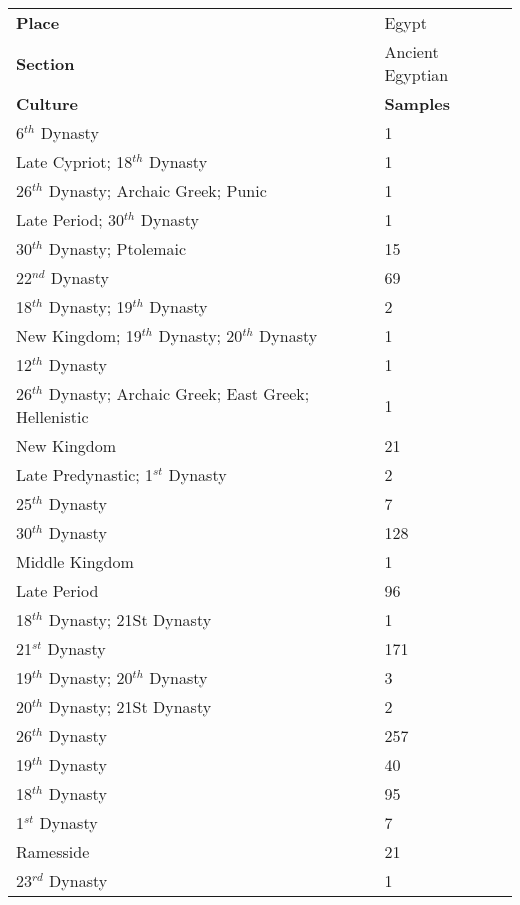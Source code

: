 \documentclass[11pt]{article}
\begin{document}
\begin{table}[ht]
    \centering
    \small
    \begin{tabularx}{\columnwidth}{Xl}
        \hline
        \rowcolor{brown!30} \textbf{Place} & Egypt \\
        \rowcolor{brown!20} \textbf{Section} & Ancient Egyptian \\
        \hline
        \rowcolor{brown!10} \textbf{Culture} & \textbf{Samples} \\
        \hline
        6$^{th}$ Dynasty & 1 \\
        Late Cypriot; 18$^{th}$ Dynasty & 1 \\
        26$^{th}$ Dynasty; Archaic Greek; Punic & 1 \\
        Late Period; 30$^{th}$ Dynasty & 1 \\
        30$^{th}$ Dynasty; Ptolemaic & 15 \\
        22$^{nd}$ Dynasty & 69 \\
        18$^{th}$ Dynasty; 19$^{th}$ Dynasty & 2 \\
        New Kingdom; 19$^{th}$ Dynasty; 20$^{th}$ Dynasty & 1 \\
        12$^{th}$ Dynasty & 1 \\
        26$^{th}$ Dynasty; Archaic Greek; East Greek; Hellenistic & 1 \\
        New Kingdom & 21 \\
        Late Predynastic; 1$^{st}$ Dynasty & 2 \\
        25$^{th}$ Dynasty & 7 \\
        30$^{th}$ Dynasty & 128 \\
        Middle Kingdom & 1 \\
        Late Period & 96 \\
        18$^{th}$ Dynasty; 21St Dynasty & 1 \\
        21$^{st}$  Dynasty & 171 \\
        19$^{th}$ Dynasty; 20$^{th}$ Dynasty & 3 \\
        20$^{th}$ Dynasty; 21St Dynasty & 2 \\
        26$^{th}$ Dynasty & 257 \\
        19$^{th}$ Dynasty & 40 \\
        18$^{th}$ Dynasty & 95 \\
        1$^{st}$  Dynasty & 7 \\
        Ramesside & 21 \\
        23$^{rd}$  Dynasty & 1 \\

\end{tabularx}
\end{table}
\end{document}

